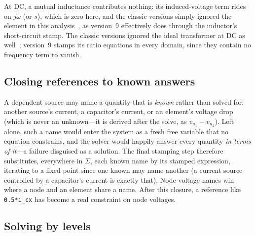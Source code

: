 \documentclass[11pt,oneside]{report}
\newcommand{\code}[1]{\texttt{#1}}
\begin{document}
At DC, a mutual inductance contributes nothing: its induced-voltage
term rides on $j\omega$ (or $s$), which is zero here, and the classic
versions simply ignored the element in this
analysis~\cite[\S6.11]{thesis2000}, as version~9 effectively does
through the inductor's short-circuit stamp. The classic versions
ignored the ideal transformer at DC as well~\cite[\S6.12]{thesis2000};
version~9 stamps its ratio equations in every domain, since they
contain no frequency term to vanish.

\subsection{Closing references to known answers}
\label{sec:closure}

A dependent source may name a quantity that is \emph{known} rather
than solved for: another source's current, a capacitor's current, or
an element's voltage drop (which is never an unknown---it is derived
after the solve, as $v_{n_1}-v_{n_2}$). Left alone, such a name
would enter the system as a fresh free variable that no equation
constrains, and the solver would happily answer every quantity
\emph{in terms of it}---a failure disguised as a solution. The final
stamping step therefore substitutes, everywhere in $\Sigma$, each
known name by its stamped expression, iterating to a fixed point since
one known may name another (a current source controlled by a
capacitor's current is exactly that). Node-voltage names win where a
node and an element share a name. After this closure, a reference like
\code{0.5*i\_cx} has become a real constraint on node voltages.

\subsection{Solving by levels}
\end{document}
